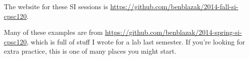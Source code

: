 \documentclass[12pt,letterpaper]{article}
\begin{document}
\thispagestyle{firstpage}

The website for these SI sessions is
\url{https://github.com/benblazak/2014-fall-si-cpsc120}.

Many of these examples are from
\url{https://github.com/benblazak/2014-spring-si-cpsc120},
which is full of stuff I wrote for a lab last semester.  If you're looking for
extra practice, this is one of many places you might start.


\filbreak
\section*{}
\end{document}
